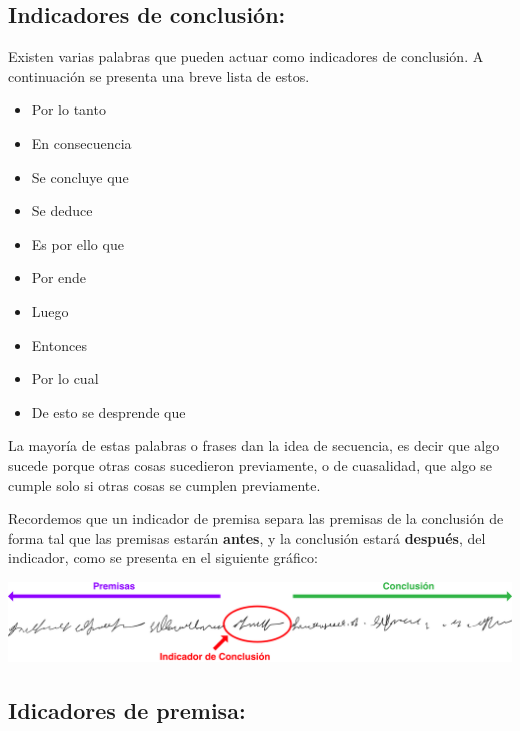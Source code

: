 \subsection{Indicadores de conclusión:}

Existen varias palabras que pueden actuar como indicadores de conclusión. A
continuación se presenta una breve lista de estos.

\begin{minipage}{0.45\textwidth}
    \begin{itemize}
        \item Por lo tanto
        \item En consecuencia
        \item Se concluye que
        \item Se deduce
        \item Es por ello que
    \end{itemize}
\end{minipage}
\begin{minipage}{0.45\textwidth}
    \begin{itemize}
        \item Por ende
        \item Luego
        \item Entonces
        \item Por lo cual
        \item De esto se desprende que
    \end{itemize}
\end{minipage}

La mayoría de estas palabras o frases dan la idea de secuencia, es decir que
algo sucede porque otras cosas sucedieron previamente, o de cuasalidad, que algo
se cumple solo si otras cosas se cumplen previamente.

Recordemos que un indicador de premisa separa las premisas de la conclusión de
forma tal que las premisas estarán \textbf{antes}, y la conclusión estará
\textbf{después}, del indicador, como se presenta en el siguiente gráfico:

\includegraphics[scale=0.5]{unidades/3_logica/2_logica_proposicional/imagenes/indicadores_conclusion.png}

\subsection{Idicadores de premisa:}

